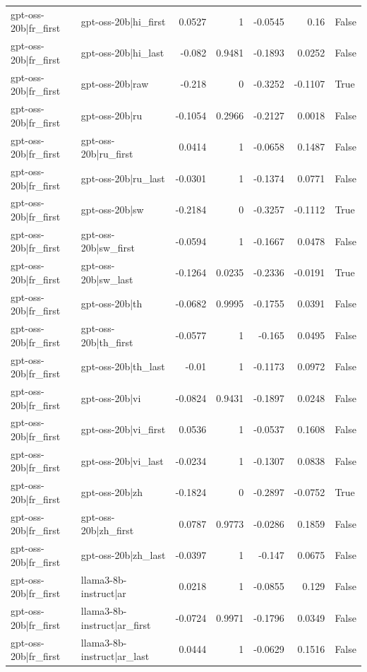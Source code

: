 \begin{table}
\begin{tabular}{l l r r r r l}
gpt-oss-20b|fr_first & gpt-oss-20b|hi_first & 0.0527 & 1 & -0.0545 & 0.16 & False \\
gpt-oss-20b|fr_first & gpt-oss-20b|hi_last & -0.082 & 0.9481 & -0.1893 & 0.0252 & False \\
gpt-oss-20b|fr_first & gpt-oss-20b|raw & -0.218 & 0 & -0.3252 & -0.1107 & True \\
gpt-oss-20b|fr_first & gpt-oss-20b|ru & -0.1054 & 0.2966 & -0.2127 & 0.0018 & False \\
gpt-oss-20b|fr_first & gpt-oss-20b|ru_first & 0.0414 & 1 & -0.0658 & 0.1487 & False \\
gpt-oss-20b|fr_first & gpt-oss-20b|ru_last & -0.0301 & 1 & -0.1374 & 0.0771 & False \\
gpt-oss-20b|fr_first & gpt-oss-20b|sw & -0.2184 & 0 & -0.3257 & -0.1112 & True \\
gpt-oss-20b|fr_first & gpt-oss-20b|sw_first & -0.0594 & 1 & -0.1667 & 0.0478 & False \\
gpt-oss-20b|fr_first & gpt-oss-20b|sw_last & -0.1264 & 0.0235 & -0.2336 & -0.0191 & True \\
gpt-oss-20b|fr_first & gpt-oss-20b|th & -0.0682 & 0.9995 & -0.1755 & 0.0391 & False \\
gpt-oss-20b|fr_first & gpt-oss-20b|th_first & -0.0577 & 1 & -0.165 & 0.0495 & False \\
gpt-oss-20b|fr_first & gpt-oss-20b|th_last & -0.01 & 1 & -0.1173 & 0.0972 & False \\
gpt-oss-20b|fr_first & gpt-oss-20b|vi & -0.0824 & 0.9431 & -0.1897 & 0.0248 & False \\
gpt-oss-20b|fr_first & gpt-oss-20b|vi_first & 0.0536 & 1 & -0.0537 & 0.1608 & False \\
gpt-oss-20b|fr_first & gpt-oss-20b|vi_last & -0.0234 & 1 & -0.1307 & 0.0838 & False \\
gpt-oss-20b|fr_first & gpt-oss-20b|zh & -0.1824 & 0 & -0.2897 & -0.0752 & True \\
gpt-oss-20b|fr_first & gpt-oss-20b|zh_first & 0.0787 & 0.9773 & -0.0286 & 0.1859 & False \\
gpt-oss-20b|fr_first & gpt-oss-20b|zh_last & -0.0397 & 1 & -0.147 & 0.0675 & False \\
gpt-oss-20b|fr_first & llama3-8b-instruct|ar & 0.0218 & 1 & -0.0855 & 0.129 & False \\
gpt-oss-20b|fr_first & llama3-8b-instruct|ar_first & -0.0724 & 0.9971 & -0.1796 & 0.0349 & False \\
gpt-oss-20b|fr_first & llama3-8b-instruct|ar_last & 0.0444 & 1 & -0.0629 & 0.1516 & False \\

\end{tabular}
\end{table}

